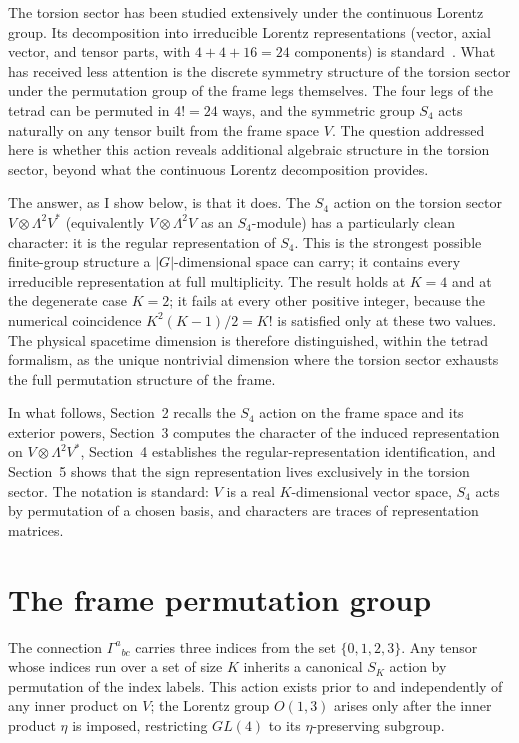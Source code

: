 \documentclass[11pt]{article}
\begin{document}
The torsion sector has been studied extensively under the continuous
Lorentz group.  Its decomposition into irreducible Lorentz
representations (vector, axial vector, and tensor parts, with
$4+4+16=24$ components) is standard~\cite{Hehl1976}.  What has
received less attention is the discrete symmetry structure of the
torsion sector under the permutation group of the frame legs
themselves.  The four legs of the tetrad can be permuted in $4!=24$
ways, and the symmetric group $S_4$ acts naturally on any tensor
built from the frame space $V$.  The question addressed here is
whether this action reveals additional algebraic structure in the
torsion sector, beyond what the continuous Lorentz decomposition
provides.

The answer, as I show below, is that it does.  The $S_4$ action on
the torsion sector $V\otimes\Lambda^2V^*$ (equivalently
$V\otimes\Lambda^2V$ as an $S_4$-module) has a particularly clean
character: it is the regular representation of $S_4$.  This is the
strongest possible finite-group structure a $|G|$-dimensional space
can carry; it contains every irreducible representation at full
multiplicity.  The result holds at $K=4$ and at the
degenerate case $K=2$; it fails at every other positive integer,
because the numerical coincidence $K^2(K-1)/2=K!$ is satisfied
only at these two values.  The physical spacetime dimension is
therefore distinguished, within the tetrad formalism, as the unique
nontrivial dimension where the torsion sector exhausts the full
permutation structure of the frame.

In what follows, Section~2 recalls the $S_4$ action on the frame
space and its exterior powers, Section~3 computes the character of
the induced representation on $V\otimes\Lambda^2V^*$, Section~4
establishes the regular-representation identification, and
Section~5 shows that the sign representation lives exclusively in
the torsion sector.  The notation is standard: $V$ is a real $K$-dimensional
vector space, $S_4$ acts by permutation of a chosen basis, and
characters are traces of representation matrices.


\section{The frame permutation group}

The connection $\Gamma^a{}_{bc}$ carries three indices from the set
$\{0,1,2,3\}$.  Any tensor whose indices run over a set of size
$K$ inherits a canonical $S_K$ action by permutation of the index
labels.  This action exists prior to and independently of any inner
product on $V$; the Lorentz group $O(1,3)$ arises only after the
inner product $\eta$ is imposed, restricting $GL(4)$ to its
$\eta$-preserving subgroup.
\end{document}
